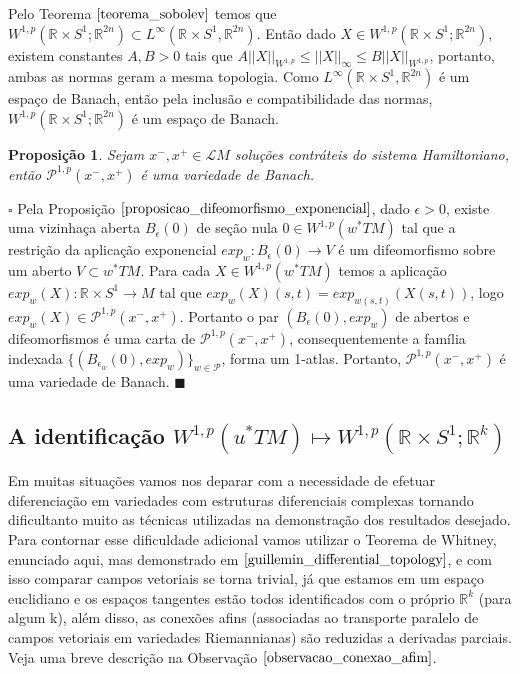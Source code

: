 \documentclass[12pt]{book}
\newtheorem{proposicao}[teorema]{Proposição}
\newenvironment{prova}[1]{$\square$ #1}{\hfill$\blacksquare$}
\newcommand{\aplicacaoexponencial}[2]{exp_{#1}(#2)}
\newcommand{\aplicacaoexponencialgeral}[1]{exp_{#1}}
\newcommand{\caminhosexponenciaisconectantesabrev}{\mathcal{P}}
\newcommand{\caminhosexponenciaisconectantes}[2]{\mathcal{P}^{1,p}(#1, #2)}
\newcommand{\caminhosexponenciaisconectantespadrao}{\caminhosexponenciaisconectantes{x^{-}}{x^{+}}}
\newcommand{\circulo}{S^{1}}
\newcommand{\espacosobolev}[1]{W^{1,p}(#1)}
\newcommand{\espacosobolevcontradominio}[2]{W^{1,p}(#1;#2)}
\newcommand{\norma}[1]{||#1||}
\newcommand{\normaWp}[1]{||#1||_{W^{1,p}}}
\newcommand{\pullbackfibradotangente}[2]{#1^{*}T#2}
\newcommand{\pullbackfibradotangenteM}[1]{\pullbackfibradotangente{#1}{M}}
\newcommand{\retacartesianocirculo}{\real{} \times \circulo}
\newcommand{\real}[1]{\mathbb{R}^{#1}}
\newcommand{\solucoesperiodicascontrateis}{\mathcal{L}M}
\begin{document}
	Pelo Teorema $\ref{teorema_sobolev}$ temos que $\espacosobolevcontradominio{\retacartesianocirculo}{\real{2n}} \subset L^{\infty}(\retacartesianocirculo, \real{2n})$. Então dado $X \in \espacosobolevcontradominio{\retacartesianocirculo}{\real{2n}}$, existem constantes $A, B >0$ tais que $A\normaWp{X}\leq \norma{X}_{\infty} \leq B\normaWp{X}$, portanto, ambas as normas geram a mesma topologia. Como $L^{\infty}(\retacartesianocirculo, \real{2n})$ é um espaço de Banach, então pela inclusão e compatibilidade das normas, $\espacosobolevcontradominio{\retacartesianocirculo}{\real{2n}}$ é um espaço de Banach.
	
	\begin{proposicao}\label{proposicao_variedade_banach}
		Sejam $x^{-}, x^{+} \in \solucoesperiodicascontrateis$ soluções contráteis do sistema Hamiltoniano, então $\caminhosexponenciaisconectantespadrao$ é uma variedade de Banach.
	\end{proposicao}
	\begin{prova}
		Pela Proposição $\ref{proposicao_difeomorfismo_exponencial}$, dado $\epsilon > 0$, existe uma vizinhaça aberta $B_{\epsilon}(0)$ de seção nula $0 \in \espacosobolev{\pullbackfibradotangenteM{w}}$ tal que a restrição da aplicação exponencial $\aplicacaoexponencialgeral{w}:B_{\epsilon}(0) \to V$ é um difeomorfismo sobre um aberto $V \subset \pullbackfibradotangenteM{w}$. Para cada $X \in \espacosobolev{\pullbackfibradotangenteM{w}}$ temos a aplicação $\aplicacaoexponencial{w}{X}:\retacartesianocirculo \to M$ tal que $\aplicacaoexponencial{w}{X}(s,t) = \aplicacaoexponencial{w(s,t)}{X(s,t)}$, logo $\aplicacaoexponencial{w}{X} \in \caminhosexponenciaisconectantespadrao$. Portanto o par $(B_{\epsilon}(0), \aplicacaoexponencialgeral{w})$ de abertos e difeomorfismos é uma carta de $\caminhosexponenciaisconectantespadrao$, consequentemente a família indexada $\{(B_{\epsilon_{w}}(0), \aplicacaoexponencialgeral{w})\}_{w \in \caminhosexponenciaisconectantesabrev}$, forma um 1-atlas. Portanto, $\caminhosexponenciaisconectantespadrao$ é uma variedade de Banach.
	\end{prova}
	
	\subsection{A identificação  $\espacosobolev{\pullbackfibradotangenteM{u}} \mapsto \espacosobolevcontradominio{\retacartesianocirculo}{\real{k}}$}
	Em muitas situações  vamos nos deparar com a necessidade de efetuar diferenciação em variedades com estruturas diferenciais complexas tornando dificultanto muito as técnicas utilizadas na demonstração dos resultados desejado. Para contornar esse dificuldade adicional vamos utilizar o Teorema de Whitney, enunciado aqui, mas demonstrado em $\cite{guillemin_differential_topology}$, e com isso comparar campos vetoriais se torna trivial, já que estamos em um espaço euclidiano e os espaços tangentes estão todos identificados com o próprio $\real{k}$ (para algum k), além disso, as conexões afins (associadas ao transporte paralelo de campos vetoriais em variedades Riemannianas) são reduzidas a derivadas parciais. Veja uma breve descrição na Observação $\ref{observacao_conexao_afim}$.
	
\end{document}
